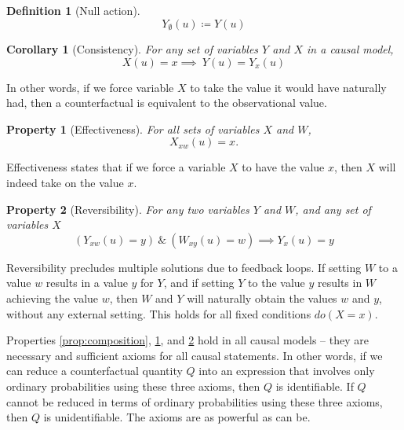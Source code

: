 \documentclass[11pt]{article}
\numberwithin{equation}{section}
\newcommand{\defeq}{\coloneqq}
\newtheorem{defn}{Definition}[section]
\newtheorem{cor}{Corollary}[section]
\newtheorem{prop}{Property}[section]
\begin{document}
\begin{defn}[Null action]
\begin{equation}
Y_{\emptyset}(u) \defeq Y(u) \nonumber
\end{equation}
\end{defn}

\begin{cor}[Consistency]
For any set of variables $Y$ and $X$ in a causal model,
\begin{equation}
X(u)=x \implies\ Y(u) = Y_x(u)
\end{equation}
\end{cor}
In other words, if we force variable $X$ to take the value it would have naturally had, then a counterfactual is equivalent to the observational value.

\begin{prop}[Effectiveness] \label{prop:effectiveness}
For all sets of variables $X$ and $W$,
\begin{equation}
X_{xw}(u) = x.
\end{equation}
\end{prop} 
Effectiveness states that if we force a variable $X$ to have the value $x$, then $X$ will indeed take on the value $x$.

\begin{prop}[Reversibility] \label{prop:reversibility}
For any two variables $Y$ and $W$, and any set of variables $X$
\begin{equation}
(Y_{xw}(u)=y)\ \&\ (W_{xy}(u)=w) \implies Y_x(u)=y
\end{equation}
\end{prop}
Reversibility precludes multiple solutions due to feedback loops. If setting $W$ to a value $w$ results in a value $y$ for $Y$, and if setting $Y$ to the value $y$ results in $W$ achieving the value $w$, then $W$ and $Y$ will naturally obtain the values $w$ and $y$, without any external setting. This holds for all fixed conditions $do(X=x)$.

Properties \ref{prop:composition}, \ref{prop:effectiveness}, and \ref{prop:reversibility} hold in all causal models -- they are necessary and sufficient axioms for all causal statements. In other words, if we can reduce a counterfactual quantity $Q$ into an expression that involves only ordinary probabilities using these three axioms, then $Q$ is identifiable. If $Q$ cannot be reduced in terms of ordinary probabilities using these three axioms, then $Q$ is unidentifiable. The axioms are as powerful as can be.
\end{document}
